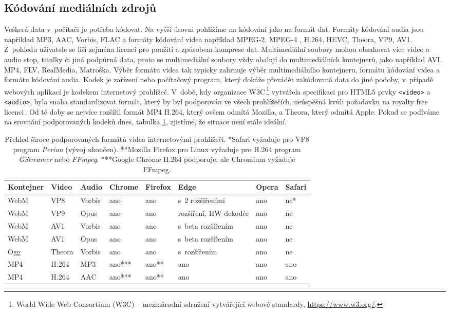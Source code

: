 \subsection{Kódování mediálních zdrojů}
Veškerá data v~počítači je potřeba kódovat. Na vyšší úrovni pohlížíme na kódování jako na formát dat. Formáty kódování audia jsou například MP3, AAC, Vorbis, FLAC a formáty kódování videa například MPEG-2, MPEG-4 , H.264, HEVC, Theora, VP9, AV1. Z~pohledu uživatele se liší zejména licencí pro použití a způsobem komprese dat. Multimediální soubory mohou obsahovat více video a audio stop, titulky či jiná podpůrná data, proto se multimediální soubory vždy obalují do multimediálních kontejnerů, jako například AVI, MP4, FLV, RealMedia, Matroška. Výběr formátu videa tak typicky zahrnuje výběr multimediálního kontejneru, formátu kódování videa a formátu kódování audia. Kodek je zařízení nebo počítačový program, který dokáže převádět zakódovaná data do jiné podoby, v~případě webových aplikací je kodekem internetový prohlížeč. V~době, kdy organizace W3C\,\footnote{World Wide Web Consortium (W3C) -- mezinárodní sdružení vytvářející webové standardy, \url{https://www.w3.org/}.} vytvářela specifikaci pro HTML5 prvky \texttt{<video>} a \texttt{<audio>}, byla snaha standardizovat formát, který by byl podporován ve všech prohlížečích, neúspěšná kvůli požadavku na royalty free licenci\,\cite{HTML5multimedia}. Od té doby se nejvíce rozšířil formát MP4 H.264, který ovšem odmítá Mozilla, a Theora, který odmítá Apple. Pokud se podíváme na srovnání podporovaných kodeků dnes, tabulka \ref{tab:codecs}, zjistíme, že situace není stále ideální.
\begin{table}[h]
    \centering
    \begin{tabular}{|l|l|l||l|l|l|l|l|}
    \hline
    Kontejner   & Video & Audio & Chrome & Firefox & Edge & Opera & Safari \\
    \hline
    WebM        & VP8   & Vorbis &ano & ano & s~2 rozšířeními & ano & ne* \\
    WebM        & VP9   & Opus & ano & ano & rozšíření, HW dekodér & ano & ne \\
    WebM        & AV1   & Vorbis & ano & ano & s~beta rozšířením & ano & ne \\
    WebM        & AV1   & Opus & ano & ano & s~beta rozšířením & ano & ne \\
    Ogg         & Theora & Vorbis & ano & ano & s~rozšířením & ano & ne \\
    MP4         & H.264 & MP3 & ano*** & ano** & ano & ano & ano \\
    MP4         & H.264 & AAC & ano*** & ano** & ano & ano & ano \\
    \hline
    \end{tabular}
    \caption{Přehled široce podporovaných formátů videa internetovými prohlížeči. *Safari vyžaduje pro VP8 program \textit{Perian} (vývoj ukončen). **Mozilla Firefox pro Linux vyžaduje pro H.264 program \textit{GStreamer} nebo \textit{FFmpeg}. ***Google Chrome H.264 podporuje, ale Chromium vyžaduje FFmpeg.}
    \label{tab:codecs}
\end{table}

